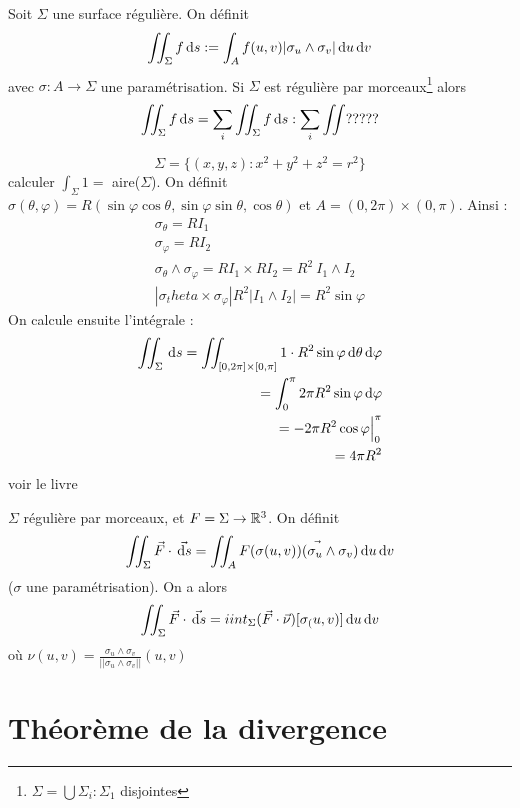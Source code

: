 \documentclass[12pt,a4paper]{article}
\begin{document}
\begin{boite}
	 Soit $\Sigma$ une surface régulière. On définit 
	\[\iint_\Sigma f \, \mathrm d s := \int_A f(u,v)|\sigma_u \wedge \sigma_v| \, \mathrm d u\, \mathrm d v\]
	avec $\sigma: A \to \Sigma$ une paramétrisation. Si $\Sigma$ est régulière par morceaux\footnote{$\Sigma = \bigcup \Sigma_i : \Sigma_1$ disjointes} alors 
	\[\iint_\Sigma f \, \mathrm d s = \sum_i \iint_\Sigma f \, \mathrm d s : \sum_i \iint ?????\]
\end{boite}

 \[\Sigma = \{(x,y,z) : x^2 + y^2 + z^2 = r^2\}\]
calculer $\int_\Sigma 1 =$ aire($\Sigma$). On définit $\sigma(\theta, \varphi) = R(\sin\varphi\cos\theta, \sin\varphi\sin\theta, \cos\theta)$ et $A = (0,2\pi) \times (0,\pi)$. Ainsi :
\begin{align*}
	\sigma_\theta = RI_1\\
	\sigma_\varphi = RI_2\\
	\sigma_\theta \wedge \sigma_\varphi = RI_1 \times RI_2 = R^2\ I_1\wedge I_2\\
	|\sigma_theta \times \sigma_\varphi|  R^2|I_1 \wedge I_2| = R^2 \sin\varphi
\end{align*}
On calcule ensuite l'intégrale :
\begin{align*}
	\iint_\Sigma \, \mathrm d s = \iint_{[0,2\pi] \times [0,\pi]} 1 \cdot R^2 \sin\varphi \, \mathrm d \theta\, \mathrm d \varphi\\
	 = \int_0^\pi 2\pi R^2 \sin\varphi \, \mathrm d \varphi\\
	= -2\pi R^2 \cos\varphi \Big|_0^\pi\\
	= 4\pi R^2
\end{align*}
 voir le livre

\begin{boite}
	 $\Sigma$ régulière par morceaux, et $F = \Sigma \to \mathbb{R}^3$. On définit 
	\[\iint_\Sigma \vec{F} \cdot  \vec{\, \mathrm d s} = \iint_A \vec{F(\sigma(u,v))(\sigma_u\wedge \sigma_v) \, \mathrm d u\, \mathrm d v}\]
	($\sigma$ une paramétrisation). On a alors 
	\[\iint_\Sigma \vec{F}\cdot \vec{\, \mathrm d s} = iint_\Sigma (\vec{F}\cdot\vec{\nu})[\sigma_(u,v)] \, \mathrm d u\, \mathrm d v\]
	où $\nu(u,v) = \frac{\sigma_u \wedge\sigma_v}{||\sigma_u \wedge\sigma_v||}(u,v)$
\end{boite}

\section{Théorème de la divergence}
\end{document}
